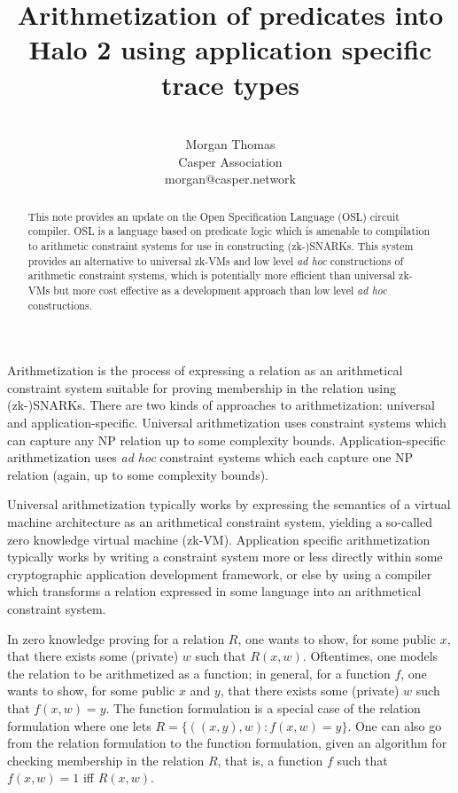 \documentclass[11pt]{article}
\title{Arithmetization of predicates into Halo 2 using application specific trace types}
\author{ \\ Morgan Thomas \\ Casper Association \\ morgan@casper.network }
\begin{document}
\maketitle

\begin{abstract}
	This note provides an update on the Open Specification Language (OSL) circuit compiler. OSL is a language based on predicate logic which is amenable to compilation to arithmetic constraint systems for use in constructing (zk-)SNARKs. This system provides an alternative to universal zk-VMs and low level \emph{ad hoc}\/ constructions of arithmetic constraint systems, which is potentially more efficient than universal zk-VMs but more cost effective as a development approach than low level \emph{ad hoc}\/ constructions.
\end{abstract}


Arithmetization is the process of expressing a relation as an arithmetical constraint system suitable for proving membership in the relation using (zk-)SNARKs. There are two kinds of approaches to arithmetization: universal and application-specific. Universal arithmetization uses constraint systems which can capture any NP relation up to some complexity bounds. Application-specific arithmetization uses \emph{ad hoc}\/ constraint systems which each capture one NP relation (again, up to some complexity bounds).

Universal arithmetization typically works by expressing the semantics of a virtual machine architecture as an arithmetical constraint system, yielding a so-called zero knowledge virtual machine (zk-VM). Application specific arithmetization typically works by writing a constraint system more or less directly within some cryptographic application development framework, or else by using a compiler which transforms a relation expressed in some language into an arithmetical constraint system.

In zero knowledge proving for a relation $R$, one wants to show, for some public $x$, that there exists some (private) $w$ such that $R(x, w)$. Oftentimes, one models the relation to be arithmetized as a function; in general, for a function $f$, one wants to show, for some public $x$ and $y$, that there exists some (private) $w$ such that $f(x, w) = y$. The function formulation is a special case of the relation formulation where one lets $R = \{((x, y), w) : f(x, w) = y\}$. One can also go from the relation formulation to the function formulation, given an algorithm for checking membership in the relation $R$, that is, a function $f$ such that $f(x, w) = 1$ iff $R(x, w)$.
\end{document}
